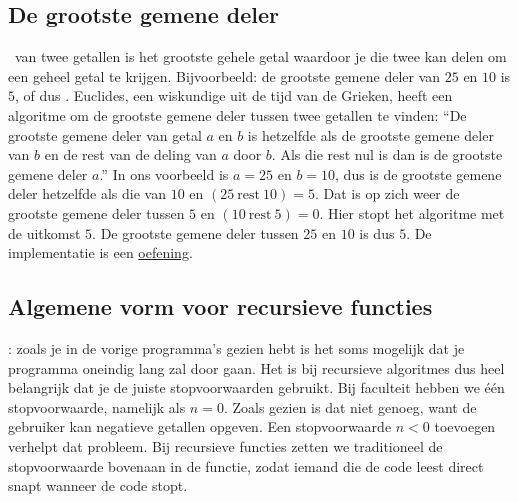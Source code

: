   \subsection{De grootste gemene deler}
  \ van twee getallen is het grootste gehele getal waardoor je die twee kan
  delen om een geheel getal te krijgen. Bijvoorbeeld: de grootste gemene deler
  van $25$ en $10$ is $5$, of dus . Euclides, een
  wiskundige uit de tijd van de Grieken, heeft een algoritme om de grootste
  gemene deler tussen twee getallen te vinden:
  ``De grootste gemene deler van getal $a$ en $b$ is hetzelfde als de grootste
  gemene deler van $b$ en de rest van de deling van $a$ door $b$. Als die rest
  nul is dan is de grootste gemene deler $a$.'' In ons voorbeeld is $a = 25$ en $b
  = 10$, dus is de grootste gemene deler hetzelfde als die van $10$ en $(25\
  \text{rest}\ 10) = 5$. Dat is op zich weer de grootste gemene deler tussen $5$
  en $(10\ \text{rest}\ 5) = 0$. Hier stopt het algoritme met de uitkomst $5$. De
  grootste gemene deler tussen $25$ en $10$ is dus $5$. De implementatie is een
  \href{https://github.com/TGThorax/python-ka2ring/blob/master/src/ggd.py}{oefening}.
\subsection{Algemene vorm voor recursieve functies}:
  zoals je in de vorige programma's gezien hebt is het soms mogelijk dat je
  programma oneindig lang zal door gaan. Het is bij recursieve algoritmes dus
  heel belangrijk dat je de juiste stopvoorwaarden gebruikt. Bij faculteit
  hebben we \'e\'en stopvoorwaarde, namelijk als $n=0$. Zoals gezien is dat niet
  genoeg, want de gebruiker kan negatieve getallen opgeven. Een stopvoorwaarde
  $n<0$ toevoegen verhelpt dat probleem. Bij recursieve functies zetten we
  traditioneel de stopvoorwaarde bovenaan in de functie, zodat iemand die de
  code leest direct snapt wanneer de code stopt.
